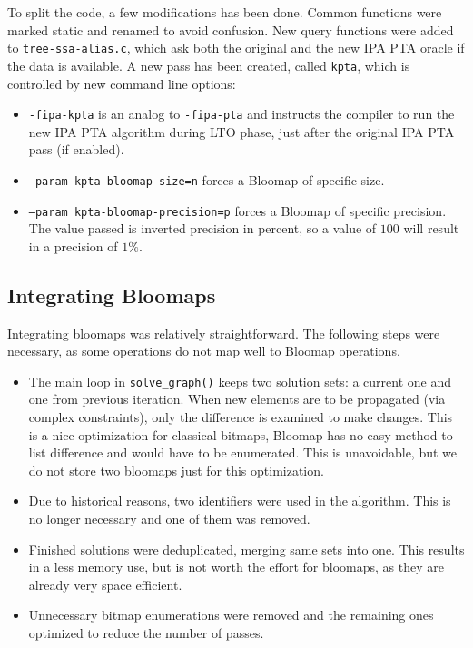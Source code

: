To split the code, a few modifications has been done. Common functions were
marked static and renamed to avoid confusion. New query functions were added to
{\tt tree-ssa-alias.c}, which ask both the original and the new IPA PTA oracle
if the data is available. A new pass has been created, called {\tt kpta}, which
is controlled by new command line options:

\begin{itemize}
	\item {\tt -fipa-kpta} is an analog to {\tt -fipa-pta} and instructs the compiler to run the new IPA PTA algorithm during LTO phase, just after the original IPA PTA pass (if enabled).
	\item {\tt --param kpta-bloomap-size=n} forces a Bloomap of specific size.
	\item {\tt --param kpta-bloomap-precision=p} forces a Bloomap of specific precision. The value passed is inverted precision in percent, so a value of $100$ will result in a precision of $1\%$.
\end{itemize}


\subsection{Integrating Bloomaps}

Integrating bloomaps was relatively straightforward. The following steps were necessary, as some operations do not map well to Bloomap operations.

\begin{itemize}
	\item The main loop in {\tt solve\_graph()} keeps two solution sets: a
		current one and one from previous iteration. When new elements are to
		be propagated (via complex constraints), only the difference is
		examined to make changes. This is a nice optimization for classical
		bitmaps, Bloomap has no easy method to list difference and would have
		to be enumerated. This is unavoidable, but we do not store two bloomaps
		just for this optimization.
	\item Due to historical reasons, two identifiers were used in the
		algorithm. This is no longer necessary and one of them was removed.
	\item Finished solutions were deduplicated, merging same sets into one. This
		results in a less memory use, but is not worth the effort
		for bloomaps, as they are already very space efficient.
	\item Unnecessary bitmap enumerations were removed and the remaining ones
		optimized to reduce the number of passes.
\end{itemize}

